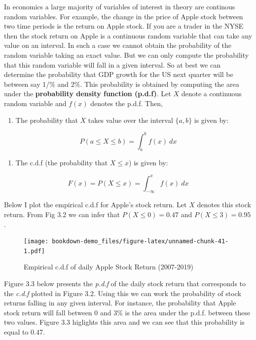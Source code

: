\documentclass[]{book}
\providecommand{\tightlist}{%
  \setlength{\itemsep}{0pt}\setlength{\parskip}{0pt}}
\theoremstyle{definition}
\theoremstyle{definition}
\theoremstyle{definition}
\theoremstyle{remark}
\begin{document}
In economics a large majority of variables of interest in theory are continous random variables. For example, the change in the price of Apple stock between two time periods is the return on Apple stock. If you are a trader in the NYSE then the stock return on Apple is a continuous random variable that can take any value on an interval. In such a case we cannot obtain the probability of the random variable taking an exact value. But we can only compute the probability that this random variable will fall in a given interval. So at best we can determine the probability that GDP growth for the US next quarter will be between say 1/\% and 2\%. This probability is obtained by computing the area under the \textbf{probability density function (p.d.f)}. Let \(X\) denote a continuous random variable and \(f(x)\) denotes the p.d.f. Then,

\begin{enumerate}
\def\labelenumi{\arabic{enumi}.}
\tightlist
\item
  The probability that \(X\) takes value over the interval \(\{a,b\}\) is given by:
\end{enumerate}

\[P(a\leq X \leq b)=\int_a^bf(x) \ dx\]

\begin{enumerate}
\def\labelenumi{\arabic{enumi}.}
\setcounter{enumi}{1}
\tightlist
\item
  The c.d.f (the probability that \(X\leq x\)) is given by:
\end{enumerate}

\[F(x)=P(X\leq x)=\int_{-\infty}^xf(x) \ dx\]

Below I plot the empirical c.d.f for Apple's stock return. Let \(X\) denotes this stock return. From Fig 3.2 we can infer that \(P(X\leq 0)=0.47\) and \(P(X\leq 3)=0.95\).

\begin{figure}
\centering
\texttt{[image: bookdown-demo\_files/figure-latex/unnamed-chunk-41-1.pdf]}
\caption{\label{fig:unnamed-chunk-41}Empirical c.d.f of daily Apple Stock Return (2007-2019)}
\end{figure}

Figure 3.3 below presents the \emph{p.d.f} of the daily stock return that corresponds to the \emph{c.d.f} plotted in Figure 3.2. Using this we can work the probability of stock returns falling in any given interval. For instance, the probability that Apple stock return will fall between 0 and 3\% is the area under the p.d.f. between these two values. Figure 3.3 higlights this area and we can see that this probability is equal to 0.47.
\end{document}
